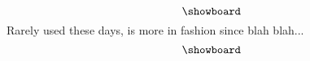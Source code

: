 \documentclass{article}
\begin{document}
	\newgame
	\[ \showboard \]
	 Rarely used these days,
	 is more in fashion since blah blah... \\
	\[ \showboard \]
\end{document}
